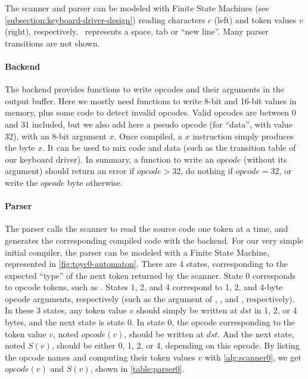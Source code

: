\begin{Figure}
  \newcommand\vsp[1][.75em]{%
    \makebox[#1]{%
      \kern.07em
      \vrule height.3ex
      \hrulefill
      \vrule height.3ex
      \kern.07em
    }%
  }
  

  \caption{The scanner and parser can be modeled with Finite State Machines (see
  \cref{subsection:keyboard-driver-design}) reading characters $c$ (left) and
  token values $v$ (right), respectively. \vsp~represents a space, tab or ``new
  line''. Many parser transitions are not shown.}\label{fig:toyc0-automaton}
\end{Figure}

\bigskip \paragraph*{Backend} The backend provides functions to write opcodes
and their arguments in the output buffer. Here we mostly need functions to
write 8-bit and 16-bit values in memory, plus some code to detect invalid
opcodes. Valid opcodes are between 0 and 31 included, but we also add here a
pseudo opcode  (for ``data'', with value 32), with an 8-bit argument
$x$. Once compiled, a  $x$ instruction simply produces the byte $x$. It
can be used to mix code and data (such as the transition table of our keyboard
driver). In summary, a function to write an $opcode$ (without its argument)
should return an error if $opcode>32$, do nothing if $opcode=32$, or write the
$opcode$ byte otherwise.

\bigskip \paragraph*{Parser} The parser calls the scanner to read the source
code one token at a time, and generates the corresponding compiled code with the
backend. For our very simple initial compiler, the parser can be modeled with a
Finite State Machine, represented in \cref{fig:toyc0-automaton}. There are 4
states, corresponding to the expected ``type'' of the next token returned by the
scanner. State 0 corresponds to opcode tokens, such as . States 1, 2,
and 4 correspond to 1, 2, and 4-byte opcode arguments, respectively (such as the
argument of , , and , respectively). In these 3
states, any token value $v$ should simply be written at $dst$ in 1, 2, or 4
bytes, and the next state is state 0. In state 0, the opcode corresponding to
the token value $v$, noted $opcode(v)$, should be written at $dst$. And the next
state, noted $S(v)$, should be either 0, 1, 2, or 4, depending on this opcode.
By listing the opcode names and computing their token values $v$ with
\cref{alg:scanner0}, we get $opcode(v)$ and $S(v)$, shown in
\cref{table:parser0}.

